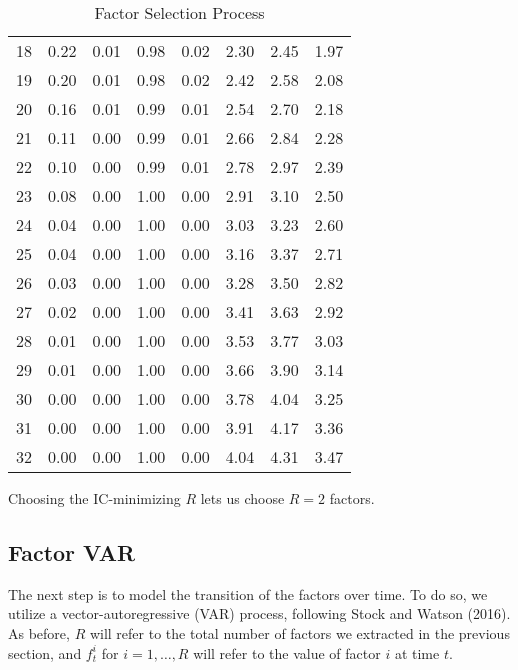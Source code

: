\documentclass[11pt, letterpaper]{article}\usepackage[]{graphicx}\usepackage[]{color}
\begin{document}
\begin{table}[H]
\begin{tabular}{cccccccc}
   18 & 0.22 & 0.01 & 0.98 & 0.02 & 2.30 & 2.45 & 1.97 \\ 
   19 & 0.20 & 0.01 & 0.98 & 0.02 & 2.42 & 2.58 & 2.08 \\ 
   20 & 0.16 & 0.01 & 0.99 & 0.01 & 2.54 & 2.70 & 2.18 \\ 
   21 & 0.11 & 0.00 & 0.99 & 0.01 & 2.66 & 2.84 & 2.28 \\ 
   22 & 0.10 & 0.00 & 0.99 & 0.01 & 2.78 & 2.97 & 2.39 \\ 
   23 & 0.08 & 0.00 & 1.00 & 0.00 & 2.91 & 3.10 & 2.50 \\ 
   24 & 0.04 & 0.00 & 1.00 & 0.00 & 3.03 & 3.23 & 2.60 \\ 
   25 & 0.04 & 0.00 & 1.00 & 0.00 & 3.16 & 3.37 & 2.71 \\ 
   26 & 0.03 & 0.00 & 1.00 & 0.00 & 3.28 & 3.50 & 2.82 \\ 
   27 & 0.02 & 0.00 & 1.00 & 0.00 & 3.41 & 3.63 & 2.92 \\ 
   28 & 0.01 & 0.00 & 1.00 & 0.00 & 3.53 & 3.77 & 3.03 \\ 
   29 & 0.01 & 0.00 & 1.00 & 0.00 & 3.66 & 3.90 & 3.14 \\ 
   30 & 0.00 & 0.00 & 1.00 & 0.00 & 3.78 & 4.04 & 3.25 \\ 
   31 & 0.00 & 0.00 & 1.00 & 0.00 & 3.91 & 4.17 & 3.36 \\ 
   32 & 0.00 & 0.00 & 1.00 & 0.00 & 4.04 & 4.31 & 3.47 \\ 
   \hline
\end{tabular}
\endgroup
\caption{Factor Selection Process} 
\end{table}


Choosing the IC-minimizing $R$ lets us choose $R = 2$ factors.



\subsection{Factor VAR}
The next step is to model the transition of the factors over time. To do so, we utilize a vector-autoregressive (VAR) process, following Stock and Watson (2016). As before, $R$ will refer to the total number of factors we extracted in the previous section, and $f^i_t$ for $i = 1, \dots, R$ will refer to the value of factor $i$ at time $t$.
\end{document}
